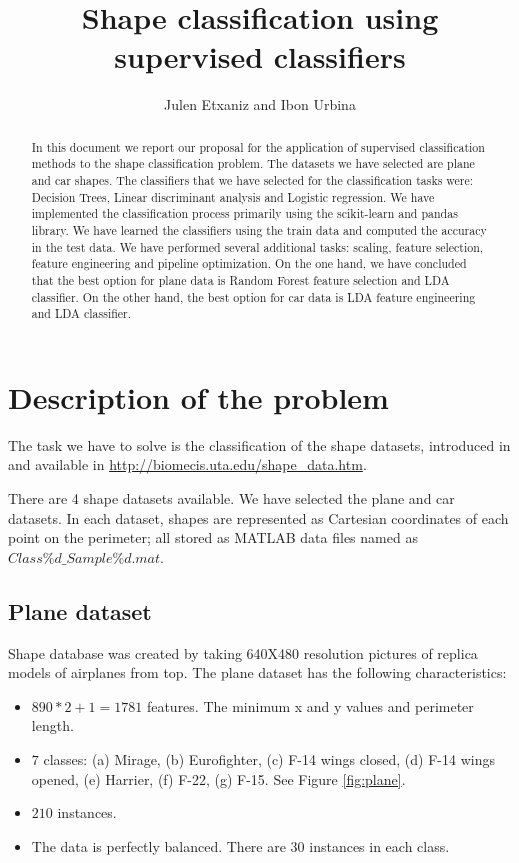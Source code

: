 \documentclass{article} %
\title{Shape classification using supervised classifiers}
\author{Julen Etxaniz and Ibon Urbina}
\begin{document}
\maketitle

\begin{abstract}
In this document we report our proposal for the application of supervised classification methods to the shape classification problem. The datasets we have selected are plane and car shapes. The classifiers that we have selected for the classification tasks were: Decision Trees, Linear discriminant analysis and Logistic regression. We have implemented the classification process primarily using the scikit-learn and pandas library. We have learned the classifiers using the train data and computed the accuracy in the test data. We have performed several additional tasks: scaling, feature selection, feature engineering and pipeline optimization. On the one hand, we have concluded that the best option for plane data is Random Forest feature selection and LDA classifier. On the other hand, the best option for car data is LDA feature engineering and LDA classifier.
\end{abstract}

\tableofcontents
\newpage

\section{Description of the problem}
The task we have to solve is the classification of the shape datasets, introduced in \cite{Thakoor:2007} \cite{Thakoor:2005-July} \cite{Thakoor:2005-Oct} and available in \url{http://biomecis.uta.edu/shape_data.htm}. 
 
There are 4 shape datasets available. We have selected the plane and car datasets. In each dataset, shapes are represented as Cartesian coordinates of each point on the perimeter; all stored as MATLAB data files named as $Class\%d\_Sample\%d.mat$.

\subsection{Plane dataset}

Shape database was created by taking 640X480 resolution pictures of replica models of airplanes from top.
The plane dataset has the following characteristics:

\begin{itemize}
    \item $890*2+1=1781$ features. The minimum x and y values and perimeter length.
    \item $7$ classes: (a) Mirage, (b) Eurofighter, (c) F-14 wings closed, (d) F-14 wings opened, (e) Harrier, (f) F-22, (g) F-15. See Figure \ref{fig:plane}.
    \item $210$ instances. 
    \item The data is perfectly balanced. There are 30 instances in each class.
\end{itemize}
\end{document}
